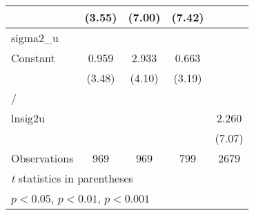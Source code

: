 {\begin{longtable}{l*{4}{c}}
                &   (3.55)         &   (7.00)         &   (7.42)         &                  \\
\hline
sigma2\_u        &                  &                  &                  &                  \\
Constant        &    0.959\sym{***}&    2.933\sym{***}&    0.663\sym{**} &                  \\
                &   (3.48)         &   (4.10)         &   (3.19)         &                  \\
\hline
/               &                  &                  &                  &                  \\
lnsig2u         &                  &                  &                  &    2.260\sym{***}\\
                &                  &                  &                  &   (7.07)         \\
\hline
Observations    &      969         &      969         &      799         &     2679         \\
\hline\hline
\multicolumn{5}{l}{\footnotesize \textit{t} statistics in parentheses}\\
\multicolumn{5}{l}{\footnotesize \sym{*} \(p<0.05\), \sym{**} \(p<0.01\), \sym{***} \(p<0.001\)}\\
\end{longtable}
}
